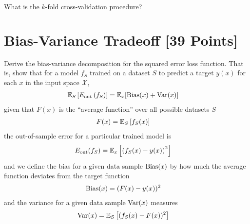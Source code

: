 \begin{problem}[2]
What is the $k$-fold cross-validation procedure?
\end{problem}
\begin{solution}

\end{solution}

\newpage
\section{Bias-Variance Tradeoff [39 Points]}

\begin{problem}[5]
Derive the bias-variance decomposition for the squared error loss function.
That is, show that for a model $f_S$ trained on a dataset $S$ to predict a target $y(x)$ for each $x$ in the input space $\mathcal{X}$,
\begin{align}
	\mathbb{E}_S \left[E_\text{out}\left(f_S\right)\right] & = \mathbb{E}_x[\operatorname{Bias}(x) + \operatorname{Var}(x)]
\end{align}
given that $F(x)$ is the ``average function'' over all possible datasets $S$
\begin{align}
	F(x) & = \mathbb{E}_S\left[f_S(x) \right]
\end{align}
the out-of-sample error for a particular trained model is
\begin{align}
	E_\text{out}(f_S) & = \mathbb{E}_x\left[\left(f_S(x) - y(x)\right)^2\right]
\end{align}
and we define the bias for a given data sample $\operatorname{Bias}(x)$ by how much the average function deviates from the target function
\begin{align}
	\operatorname{Bias}(x) & = (F(x) - y(x))^2
\end{align}
and the variance for a given data sample $\operatorname{Var}(x)$ measures
\begin{align}
	\operatorname{Var}(x) & = \mathbb{E}_S\left[(f_S(x) - F(x))^2\right]
\end{align}
\end{problem}

\begin{solution}

\end{solution}

